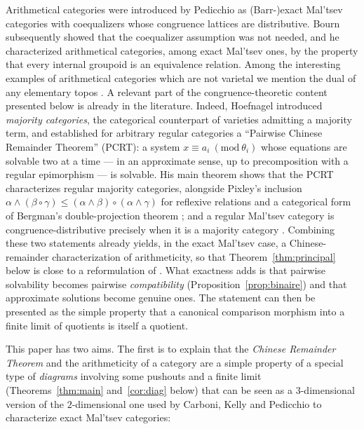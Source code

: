 \documentclass[11pt,a4paper]{article}
\theoremstyle{plain}
\theoremstyle{definition}
\theoremstyle{remark}
\theoremstyle{plain}
\newcommand{\md}[1]{\ (\mathrm{mod}\ #1)}
\begin{document}
Arithmetical categories were introduced by Pedicchio
\cite{Pedicchio} as (Barr-)exact Mal'tsev categories with coequalizers whose
congruence lattices are distributive. Bourn \cite{Bourn} subsequently
showed that the coequalizer assumption was not needed, and he characterized
arithmetical categories, among exact Mal'tsev ones, by the property that
every internal groupoid is an equivalence relation.
Among the interesting examples of arithmetical categories which are not varietal we mention the dual of any elementary topos \cite{CKP, Pedicchio, Bourn3}.
A relevant part of the congruence-theoretic content presented below is already in
the literature. Indeed, Hoefnagel
\cite{Hoefnagel, Hoefnagel2, Hoefnagel3} introduced \emph{majority categories}, the
categorical counterpart of varieties admitting a majority term, and
established for arbitrary regular categories a ``Pairwise Chinese Remainder
Theorem'' (PCRT): a system $x \equiv a_i \md{\theta_i}$ whose equations are
solvable two at a time --- in an approximate sense, up to precomposition
with a regular epimorphism --- is solvable. His main theorem shows that the
PCRT characterizes regular majority categories, alongside Pixley's
inclusion
$\alpha \wedge (\beta \circ \gamma) \le
(\alpha \wedge \beta) \circ (\alpha \wedge \gamma)$
for reflexive relations and a categorical form of Bergman's
double-projection theorem \cite{Bergman}; and a regular Mal'tsev category
is congruence-distributive precisely when it is a majority category
\cite[Cor.~2]{Hoefnagel}. Combining these two statements already yields, in
the exact Mal'tsev case, a Chinese-remainder characterization of
arithmeticity, so that Theorem~\ref{thm:principal} below is close to a
reformulation of \cite{Hoefnagel}. What exactness adds is that pairwise
solvability becomes pairwise \emph{compatibility}
(Proposition~\ref{prop:binaire}) and that approximate solutions become
genuine ones. The statement can then be presented as the simple property that a
canonical comparison morphism into a finite limit of quotients is itself a quotient.



This paper has two aims. The first is to explain that the \emph{Chinese Remainder Theorem}
and the arithmeticity of a category are a simple property of a special type of \emph{diagrams} involving some pushouts and a finite limit
(Theorems~\ref{thm:main} and~\ref{cor:diag} below) that can be seen as a $3$-dimensional version of the $2$-dimensional one used by Carboni, Kelly and Pedicchio to characterize exact Mal'tsev categories:
\end{document}
